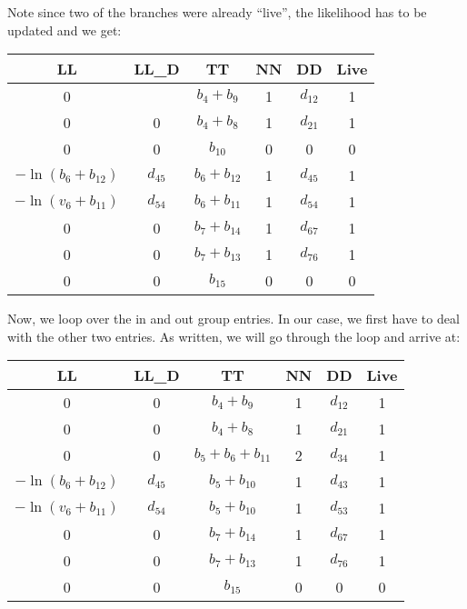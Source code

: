 \documentclass[11pt]{article}
\begin{document}
\begin{tiny}
Note since two of the branches were already ``live'', the likelihood has to be updated and we get:
\begin{center}
\begin{tabular}{cccccc}
\hline
LL  & LL\_D  & TT  & NN & DD  & Live \\
\hline
0   &              & $b_4+b_9$        & 1  & $d_{12}$   & 1 \\
0   & 0            & $b_4+b_8$        & 1  & $d_{21}$   & 1 \\
0   & 0            & $b_{10}$           & 0  & 0   & 0 \\
$-\ln(b_6+b_{12})$   & $d_{45}$ & $b_6 + b_{12}$   & 1  & $d_{45}$   & 1 \\
$-\ln(v_6+b_{11})$   & $d_{54}$ & $b_6 + b_{11}$   & 1  & $d_{54}$   & 1 \\
0   & 0            & $b_7+b_{14}$     & 1  & $d_{67}$   & 1 \\
0   & 0            & $b_7+b_{13}$     & 1  & $d_{76}$   & 1 \\
0   & 0            & $b_15$   & 0     & 0   & 0 \\
\hline
\end{tabular}
\end{center}
Now, we loop over the in and out group entries. In our case, we first have to deal with the other two entries. As written, we will go through the loop and arrive at:
\begin{center}
\begin{tabular}{cccccc}
\hline
LL  & LL\_D  & TT  & NN & DD  & Live \\
\hline
0   & 0            & $b_4+b_9$        & 1  & $d_{12}$   & 1 \\
0   & 0            & $b_4+b_8$        & 1  & $d_{21}$   & 1 \\
0   & 0            & $b_5+b_6+b_{11}$           & 2  & $d_{34}$   & 1 \\
$-\ln(b_6+b_{12})$   & $d_{45}$ & $b_5 + b_{10}$   & 1  & $d_{43}$   & 1 \\
$-\ln(v_6+b_{11})$   & $d_{54}$ & $b_5 + b_{10}$   & 1  & $d_{53}$   & 1 \\
0   & 0            & $b_7+b_{14}$     & 1  & $d_{67}$   & 1 \\
0   & 0            & $b_7+b_{13}$     & 1  & $d_{76}$   & 1 \\
0   & 0            & $b_{15}$   & 0     & 0   & 0 \\
\hline
\end{tabular}
\end{center}


\end{tiny}
\end{document}
